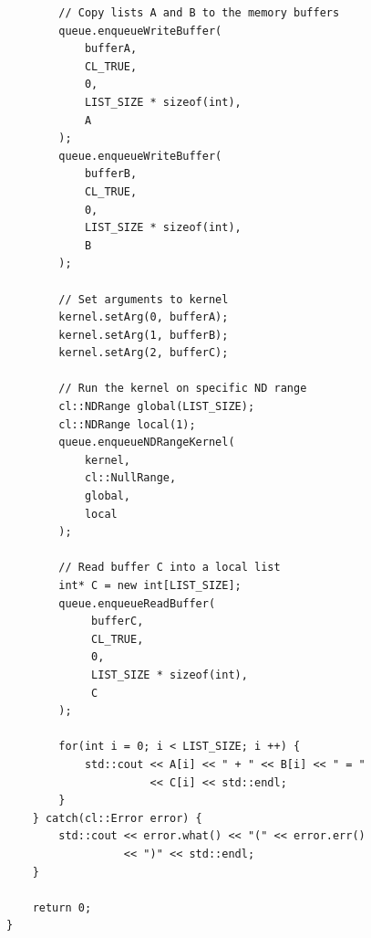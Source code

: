\begin{lstlisting}
        // Copy lists A and B to the memory buffers
        queue.enqueueWriteBuffer(
            bufferA,
            CL_TRUE,
            0,
            LIST_SIZE * sizeof(int),
            A
        );
        queue.enqueueWriteBuffer(
            bufferB,
            CL_TRUE,
            0,
            LIST_SIZE * sizeof(int),
            B
        );
 
        // Set arguments to kernel
        kernel.setArg(0, bufferA);
        kernel.setArg(1, bufferB);
        kernel.setArg(2, bufferC);

        // Run the kernel on specific ND range
        cl::NDRange global(LIST_SIZE);
        cl::NDRange local(1);
        queue.enqueueNDRangeKernel(
            kernel,
            cl::NullRange,
            global,
            local
        );
 
        // Read buffer C into a local list
        int* C = new int[LIST_SIZE];
        queue.enqueueReadBuffer(
             bufferC,
             CL_TRUE,
             0,
             LIST_SIZE * sizeof(int),
             C
        );

        for(int i = 0; i < LIST_SIZE; i ++) {
            std::cout << A[i] << " + " << B[i] << " = "
                      << C[i] << std::endl;
        }
    } catch(cl::Error error) {
        std::cout << error.what() << "(" << error.err()
                  << ")" << std::endl;
    }
 
    return 0;
}
\end{lstlisting}




